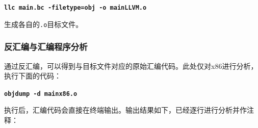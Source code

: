 \documentclass[UTF8,a4paper,10pt]{ctexart}
\begin{document}
\begin{center}
    \textcolor{deepblue}{\textbf{\texttt{\large{llc main.bc -filetype=obj -o mainLLVM.o}}}}
\end{center}

生成各自的\texttt{.o}目标文件。

\subsubsection{反汇编与汇编程序分析}
通过反汇编，可以得到与目标文件对应的原始汇编代码。此处仅对x86进行分析，执行下面的代码：
\begin{center}
    \textcolor{deepblue}{\textbf{\texttt{\large{objdump -d mainx86.o}}}}
\end{center}

执行后，汇编代码会直接在终端输出。输出结果如下，已经逐行进行分析并作注释：
\end{document}
